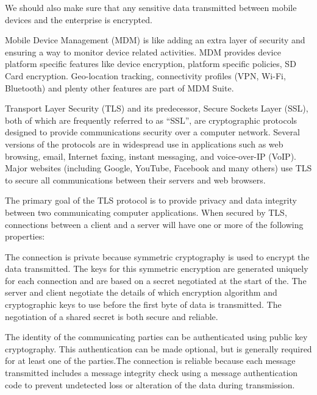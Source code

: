 We should also make sure that any sensitive data transmitted between mobile devices and the enterprise is encrypted.

Mobile Device Management (MDM) is like adding an extra layer of security and ensuring a way to monitor device related activities. MDM provides device platform specific features like device encryption, platform specific policies, SD Card encryption. Geo-location tracking, connectivity profiles (VPN, Wi-Fi, Bluetooth) and plenty other features are part of MDM Suite.

Transport Layer Security (TLS) and its predecessor, Secure Sockets Layer (SSL), both of which are frequently referred to as ``SSL'', are cryptographic protocols designed to provide communications security over a computer network. Several versions of the protocols are in widespread use in applications such as web browsing, email, Internet faxing, instant messaging, and voice-over-IP (VoIP). Major websites (including Google, YouTube, Facebook and many others) use TLS to secure all communications between their servers and web browsers.

The primary goal of the TLS protocol is to provide privacy and data integrity between two communicating computer applications. When secured by TLS, connections between a client and a server will have one or more of the following properties:

The connection is private because symmetric cryptography is used to encrypt the data transmitted. The keys for this symmetric encryption are generated uniquely for each connection and are based on a secret negotiated at the start of the. The server and client negotiate the details of which encryption algorithm and cryptographic keys to use before the first byte of data is transmitted. The negotiation of a shared secret is both secure and reliable.

The identity of the communicating parties can be authenticated using public key cryptography. This authentication can be made optional, but is generally required for at least one of the parties.The connection is reliable because each message transmitted includes a message integrity check using a message authentication code to prevent undetected loss or alteration of the data during transmission.
